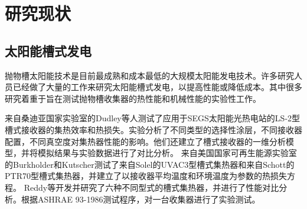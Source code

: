 \section{研究现状}

\subsection{太阳能槽式发电}

抛物槽太阳能技术是目前最成熟和成本最低的大规模太阳能发电技术\cite{Price2002}。许多研究人员已经做了大量的工作来研究太阳能槽式发电，以提高性能或降低成本。其中很多研究着重于旨在测试抛物槽收集器的热性能和机械性能的实验性工作。

来自桑迪亚国家实验室的Dudley等人\cite{Dudley1994}测试了应用于SEGS太阳能光热电站的LS-2型槽式接收器的集热效率和热损失。实验分析了不同类型的选择性涂层，不同接收器配置，不同真空度对集热器性能的影响。他们还建立了槽式接收器的一维分析模型，并将模拟结果与实验数据进行了对比分析。
来自美国国家可再生能源实验室的Burkholder和Kutscher\cite{Burkholder2009}测试了来自Solel的UVAC3型槽式集热器和来自Schott的PTR70型槽式集热器，并建立了以接收器平均温度和环境温度为参数的热损失方程。
Reddy等\cite{Reddy2015b}开发并研究了六种不同型式的槽式集热器，并进行了性能对比分析。根据ASHRAE 93-1986测试程序，对一台收集器进行了实验测试。

